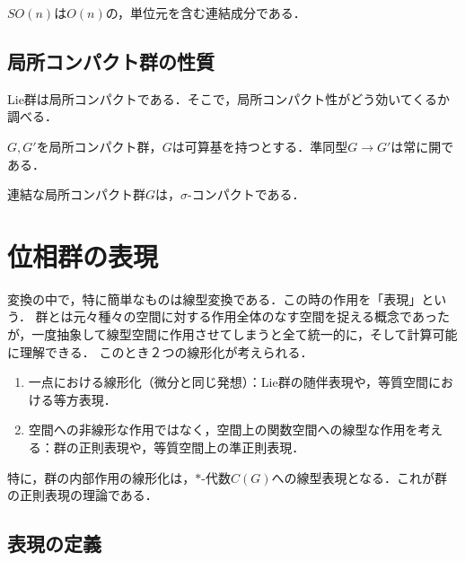 \documentclass[uplatex,dvipdfmx]{jsreport}
\begin{document}
\begin{proposition}
    $SO(n)$は$O(n)$の，単位元を含む連結成分である．
\end{proposition}

\subsection{局所コンパクト群の性質}

\begin{tcolorbox}[colframe=ForestGreen, colback=ForestGreen!10!white,breakable,colbacktitle=ForestGreen!40!white,coltitle=black,fonttitle=\bfseries\sffamily,
title=]
    Lie群は局所コンパクトである．そこで，局所コンパクト性がどう効いてくるか調べる．
\end{tcolorbox}

\begin{theorem}
    $G,G'$を局所コンパクト群，$G$は可算基を持つとする．準同型$G\to G'$は常に開である．
\end{theorem}

\begin{theorem}
    連結な局所コンパクト群$G$は，$\sigma$-コンパクトである．
\end{theorem}
\section{位相群の表現}

\begin{tcolorbox}[colframe=ForestGreen, colback=ForestGreen!10!white,breakable,colbacktitle=ForestGreen!40!white,coltitle=black,fonttitle=\bfseries\sffamily,
title=]
    変換の中で，特に簡単なものは線型変換である．この時の作用を「表現」という．
    群とは元々種々の空間に対する作用全体のなす空間を捉える概念であったが，一度抽象して線型空間に作用させてしまうと全て統一的に，そして計算可能に理解できる．
    このとき２つの線形化が考えられる．
    \begin{enumerate}
        \item 一点における線形化（微分と同じ発想）：Lie群の随伴表現や，等質空間における等方表現．
        \item 空間への非線形な作用ではなく，空間上の関数空間への線型な作用を考える：群の正則表現や，等質空間上の準正則表現．
    \end{enumerate}
    特に，群の内部作用の線形化は，$*$-代数$C(G)$への線型表現となる．これが群の正則表現の理論である．
\end{tcolorbox}

\subsection{表現の定義}
\end{document}
